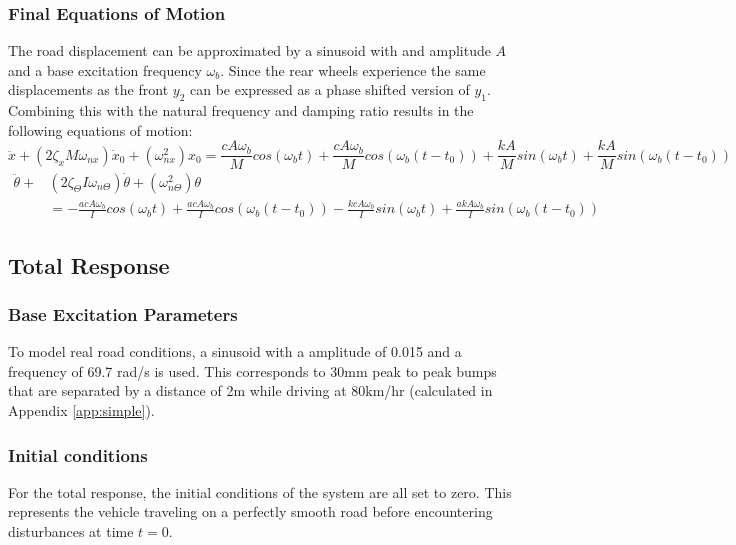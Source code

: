 \documentclass[12pt]{article}
\begin{document}
\subsubsection{Final Equations of Motion}
The road displacement can be approximated by a sinusoid with and amplitude $A$ and a base excitation frequency $\omega _b$. Since the rear wheels experience the same displacements as the front $y_2$ can be expressed as a phase shifted version of $y_1$. Combining this with the natural frequency and damping ratio results in the following equations of motion: 
\begin{equation}
	\label{eq:eomx}
	\ddot x + (2\zeta _x M \omega _{nx}) \dot x_0 + (\omega _{nx}^2)x_0 = \frac{cA\omega _b}{M}cos(\omega _b t) + \frac{cA\omega _b}{M}cos(\omega _b (t-t_0))  + \frac{kA}{M}sin(\omega _b t) + \frac{kA}{M}sin(\omega _b (t-t_0))
\end{equation}
\begin{equation}
	\label{eq:eomtheta}
	\begin{split}
		\ddot\theta + &(2\zeta _\Theta  I \omega _{n\Theta}) \dot\theta + (\omega _{n\Theta}^2)\theta \\&= -\frac{acA\omega _b}{I}cos(\omega _b t) + \frac{acA\omega _b}{I}cos(\omega _b (t-t_0)) - \frac{kcA\omega _b}{I}sin(\omega _b t) + \frac{akA\omega _b}{I}sin(\omega _b (t-t_0))
	\end{split}
\end{equation}

\subsection{Total Response}
\subsubsection{Base Excitation Parameters}
To model real road conditions, a sinusoid with a amplitude of 0.015 and a frequency of 69.7 rad/s is used. This corresponds to 30mm peak to peak bumps that are separated by a distance of 2m while driving at 80km/hr (calculated in Appendix \ref{app:simple}). 

\subsubsection{Initial conditions}
For the total response, the initial conditions of the system are all set to zero. This represents the vehicle traveling on a perfectly smooth road before encountering disturbances at time $t = 0$. 
\end{document}
